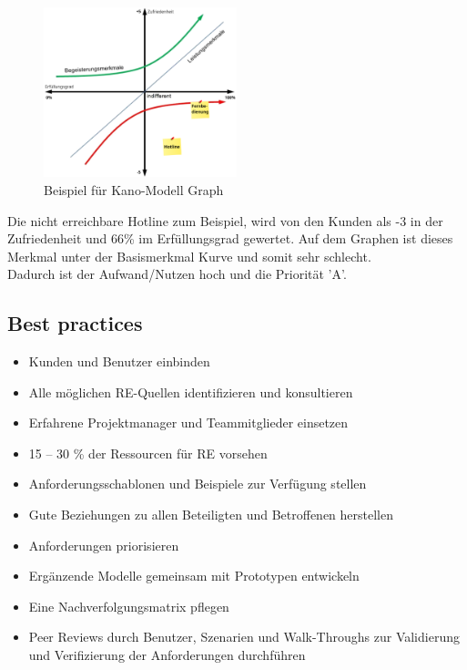 \documentclass[11pt, a4paper]{article}
\begin{document}
\begin{figure}[h]
    \centering
    \includegraphics[width=0.5\textwidth]{Kano-02.png}
    \caption{Beispiel für Kano-Modell Graph}
    \label{fig:Kano-02}
\end{figure}

\vspace{2em}

\noindent \sloppy Die nicht erreichbare Hotline zum Beispiel, wird von den Kunden als -3 in der Zufriedenheit und 66\% im Erfüllungsgrad gewertet.
Auf dem Graphen ist dieses Merkmal unter der Basismerkmal Kurve und somit sehr schlecht.\\
Dadurch ist der Aufwand/Nutzen hoch und die Priorität 'A'.

\newpage



\subsection{Best practices}

\begin{itemize}
    \item Kunden und Benutzer einbinden
    \item Alle möglichen RE-Quellen identifizieren und konsultieren
    \item Erfahrene Projektmanager und Teammitglieder einsetzen
    \item 15 – 30 \% der Ressourcen für RE vorsehen
    \item Anforderungsschablonen und Beispiele zur Verfügung stellen
    \item Gute Beziehungen zu allen Beteiligten und Betroffenen herstellen
    \item Anforderungen priorisieren
    \item Ergänzende Modelle gemeinsam mit Prototypen entwickeln
    \item Eine Nachverfolgungsmatrix pflegen
    \item Peer Reviews durch Benutzer, Szenarien und Walk-Throughs zur Validierung und Verifizierung der Anforderungen durchführen
\end{itemize}
\end{document}
